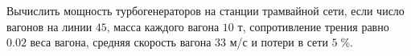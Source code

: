 Вычислить мощность турбогенераторов на станции трамвайной сети, если 
число вагонов на линии $45$, масса каждого вагона $10$ т, сопротивление 
трения равно $0.02$ веса вагона, средняя скорость вагона $33$ м/с и 
потери в сети $5\;\%$.
